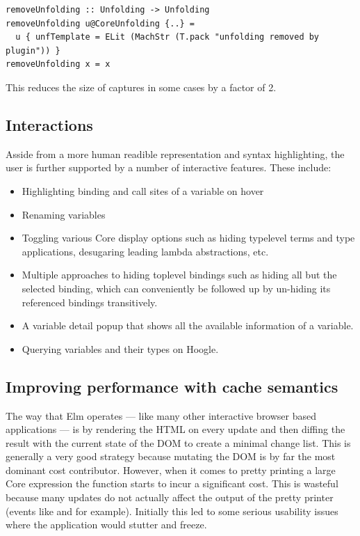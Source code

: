 \begin{listing}[H]
\begin{verbatim}
removeUnfolding :: Unfolding -> Unfolding
removeUnfolding u@CoreUnfolding {..} = 
  u { unfTemplate = ELit (MachStr (T.pack "unfolding removed by plugin")) }
removeUnfolding x = x
\end{verbatim}
\end{listing}

This reduces the size of captures in some cases by a factor of 2.

\subsection{Interactions}

Asside from a more human readible representation and syntax highlighting, the user is further supported by
a number of interactive features. These include:

\begin{itemize}
  \item Highlighting binding and call sites of a variable on hover
  \item Renaming variables
  \item Toggling various Core display options such as hiding typelevel terms and type applications, desugaring
        leading lambda abstractions, etc.
  \item Multiple approaches to hiding toplevel bindings such as hiding all but the selected binding, which
        can conveniently be followed up by un-hiding its referenced bindings transitively.
  \item A variable detail popup that shows all the available information of a variable.
  \item Querying variables and their types on Hoogle.
\end{itemize}

\subsection{Improving performance with cache semantics}

The way that Elm operates --- like many other interactive browser based applications --- is by rendering the HTML on every
update and then diffing the result with the current state of the DOM to create a minimal change list. This is generally a very
good strategy because mutating the DOM is by far the most dominant cost contributor. However, when it comes to pretty printing a
large Core expression the  function starts to incur a significant cost. This is wasteful because many updates do not
actually affect the output of the pretty printer (events like  and  for example).
Initially this led to some serious usability issues where the application would stutter and freeze.

